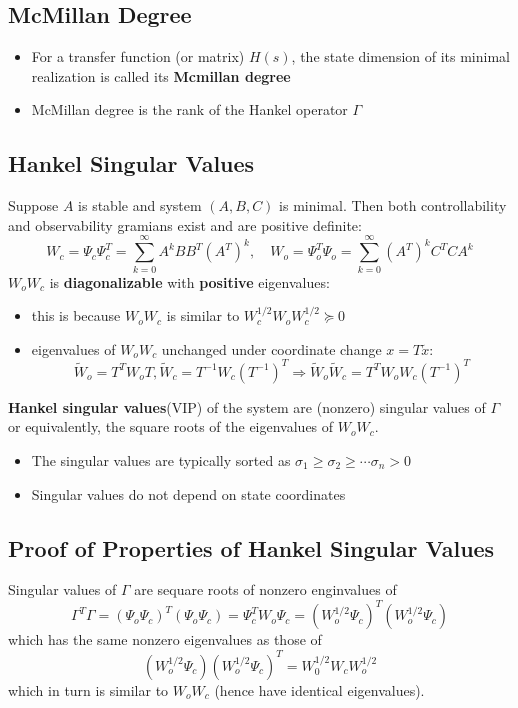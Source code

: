 \documentclass[10pt,a4paper,oneside]{article}
\begin{document}
\subsection{McMillan Degree}
\begin{itemize}
\item For a transfer function (or matrix) $H(s)$, the state dimension of its minimal realization is called its {\bfseries Mcmillan degree}
\item McMillan degree is the rank of the Hankel operator $\Gamma$ 
\end{itemize}

\subsection{Hankel Singular Values}
Suppose $A$ is stable and system $(A,B,C)$ is minimal. Then both controllability and observability gramians exist and are positive definite:
\[
W_{c}=\Psi_{c} \Psi_{c}^{T}=\sum_{k=0}^{\infty} A^{k} B B^{T}\left(A^{T}\right)^{k}, \quad W_{o}=\Psi_{o}^{T} \Psi_{o}=\sum_{k=0}^{\infty}\left(A^{T}\right)^{k} C^{T} C A^{k}
\]
$W_oW_c$ is \textbf{diagonalizable} with \textbf{positive} eigenvalues:
\begin{itemize}
\item this is because $W_oW_c$ is similar to $
W_{c}^{1 / 2} W_{o} W_{c}^{1 / 2} \succeq 0
$
\item eigenvalues of $W_oW_c$ unchanged under coordinate change $x=T\widetilde{x}$:
\[
\widetilde{W}_{o}=T^{T} W_{o} T, \widetilde{W}_{c}=T^{-1} W_{c}\left(T^{-1}\right)^{T} \Rightarrow \widetilde{W}_{o} \widetilde{W}_{c}=T^{T} W_{o} W_{c}\left(T^{-1}\right)^{T}
\]
\end{itemize}
\textbf{Hankel singular values}(VIP) of the system are (nonzero) singular values of $\Gamma$ or equivalently, the square roots of the eigenvalues of $W_oW_c$.
\begin{itemize}
	\item The singular values are typically sorted as $
	\sigma_{1} \geq \sigma_{2} \geq \cdots \sigma_{n}>0$
	\item Singular values do not depend on state coordinates
\end{itemize}

\subsection{Proof of Properties of Hankel Singular Values }
Singular values of $\Gamma$ are sequare roots of nonzero enginvalues of
\[
\Gamma^{T} \Gamma=\left(\Psi_{o} \Psi_{c}\right)^{T}\left(\Psi_{o} \Psi_{c}\right)=\Psi_{c}^{T} W_{o} \Psi_{c}=(W_{o}^{1 / 2} \Psi_{c})^{T}(W_{o}^{1 / 2} \Psi_{c})
\]
which has the same nonzero eigenvalues as those of
\[
(W_{o}^{1 / 2} \Psi_{c})(W_{o}^{1 / 2} \Psi_{c})^{T}=W_{0}^{1 / 2} W_{c} W_{o}^{1 / 2}
\]
which in turn is similar to $W_oW_c$ (hence have identical eigenvalues).
\end{document}

